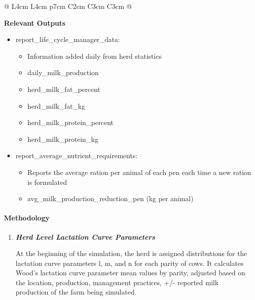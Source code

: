 \documentclass{article}
\begin{document}
\begin{refsection}
\begin{landscape}
\begin{longtable}{@{} L{4cm} L{4cm} p{7cm} C{2cm} C{3cm} C{3cm} @{}}
\end{longtable}

\end{landscape}



\textbf{Relevant Outputs}
\vspace{-0.25cm}

    \begin{itemize}
        \item report\_life\_cycle\_manager\_data:	
        \begin{itemize}
            \item Information added daily from herd statistics
            \item daily\_milk\_production 
            \item herd\_milk\_fat\_percent
            \item herd\_milk\_fat\_kg
            \item herd\_milk\_protein\_percent 
            \item herd\_milk\_protein\_kg
        \end{itemize}

        \item report\_average\_nutrient\_requirements: 
        \begin{itemize}
            \item Reports the average ration per animal of each pen each time a new ration is formulated 
            \item avg\_milk\_production\_reduction\_pen (kg per animal)
        \end{itemize}
    \end{itemize}


    \paragraph{Methodology}
    \begin{enumerate}

        \item \textbf{\textit{Herd Level Lactation Curve Parameters}} 
        \vspace{0.1cm}
        
        At the beginning of the simulation, the herd is assigned distributions for the lactation curve parameters l, m, and n for each parity of cows. It calculates Wood’s lactation curve parameter mean values by parity, adjusted based on the location, production, management practices, +/- reported milk production of the farm being simulated. 
         \vspace{0.1cm}


\end{enumerate}
\end{refsection}
\end{document}

